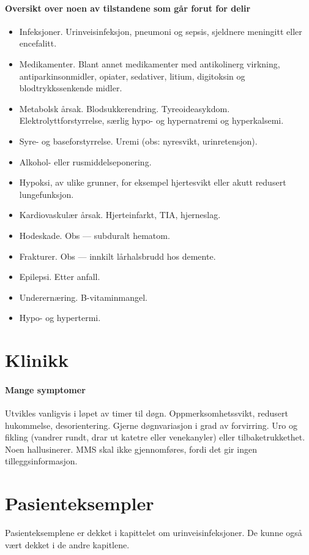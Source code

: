 				\paragraph{Oversikt over noen av tilstandene som går forut for delir\\}
					\begin{itemize}	
						\item Infeksjoner. Urinveisinfeksjon, pneumoni og sepsis, sjeldnere meningitt eller encefalitt.\\
						\item Medikamenter. Blant annet medikamenter med antikolinerg virkning, antiparkinsonmidler, opiater, sedativer, litium, digitoksin og blodtrykkssenkende midler.\\
						\item Metabolsk årsak. Blodsukkerendring. Tyreoideasykdom. Elektrolyttforstyrrelse, særlig hypo- og hypernatremi og hyperkalsemi. \\
						\item Syre- og baseforstyrrelse. Uremi (obs: nyresvikt, urinretensjon).\\
						\item Alkohol- eller rusmiddelseponering.\\
						\item Hypoksi, av ulike grunner, for eksempel hjertesvikt eller akutt redusert lungefunksjon.\\
						\item Kardiovaskulær årsak. Hjerteinfarkt, TIA, hjerneslag.\\
						\item Hodeskade. Obs — subduralt hematom.\\
						\item Frakturer. Obs — innkilt lårhalsbrudd hos demente.\\
						\item Epilepsi. Etter anfall.\\
						\item Underernæring. B-vitaminmangel.\\
						\item Hypo- og hypertermi.\\
					\end{itemize}

		\section{Klinikk}
			\paragraph{Mange symptomer}
				Utvikles vanligvis i løpet av timer til døgn. Oppmerksomhetssvikt, redusert hukommelse, desorientering. Gjerne døgnvariasjon i grad av forvirring. Uro og fikling (vandrer rundt, drar ut katetre eller venekanyler) eller tilbaketrukkethet. Noen hallusinerer. MMS skal ikke gjennomføres, fordi det gir ingen tilleggsinformasjon.
		\section{Pasienteksempler}
			Pasienteksemplene er dekket i kapittelet om urinveisinfeksjoner. De kunne også vært dekket i de andre kapitlene.